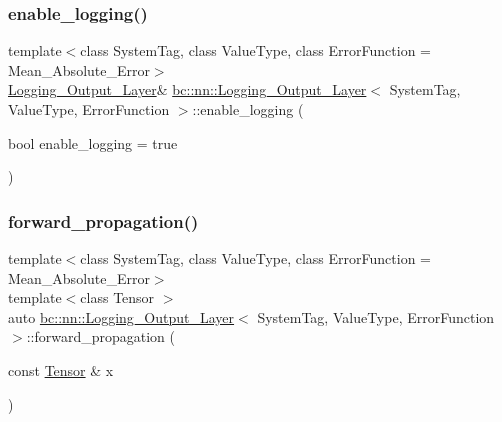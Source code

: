 \mbox{\label{structbc_1_1nn_1_1Logging__Output__Layer_a7d2a157ebe7f1626cba1e4007828a11a}} 
\subsubsection{\texorpdfstring{enable\+\_\+logging()}{enable\_logging()}}
{\footnotesize\ttfamily template$<$class System\+Tag, class Value\+Type, class Error\+Function = Mean\+\_\+\+Absolute\+\_\+\+Error$>$ \\
\hyperlink{structbc_1_1nn_1_1Logging__Output__Layer}{Logging\+\_\+\+Output\+\_\+\+Layer}\& \hyperlink{structbc_1_1nn_1_1Logging__Output__Layer}{bc\+::nn\+::\+Logging\+\_\+\+Output\+\_\+\+Layer}$<$ System\+Tag, Value\+Type, Error\+Function $>$\+::enable\+\_\+logging (\begin{DoxyParamCaption}\item[{bool}]{enable\+\_\+logging = {\ttfamily true} }\end{DoxyParamCaption})\hspace{0.3cm}{\ttfamily [inline]}}

\mbox{\label{structbc_1_1nn_1_1Logging__Output__Layer_a1462b0431b1b033ebb3e75f6fb90c865}} 
\subsubsection{\texorpdfstring{forward\+\_\+propagation()}{forward\_propagation()}}
{\footnotesize\ttfamily template$<$class System\+Tag, class Value\+Type, class Error\+Function = Mean\+\_\+\+Absolute\+\_\+\+Error$>$ \\
template$<$class Tensor $>$ \\
auto \hyperlink{structbc_1_1nn_1_1Logging__Output__Layer}{bc\+::nn\+::\+Logging\+\_\+\+Output\+\_\+\+Layer}$<$ System\+Tag, Value\+Type, Error\+Function $>$\+::forward\+\_\+propagation (\begin{DoxyParamCaption}\item[{const \hyperlink{namespacebc_a659391e47ab612be3ba6c18cf9c89159}{Tensor} \&}]{x }\end{DoxyParamCaption})\hspace{0.3cm}{\ttfamily [inline]}}

